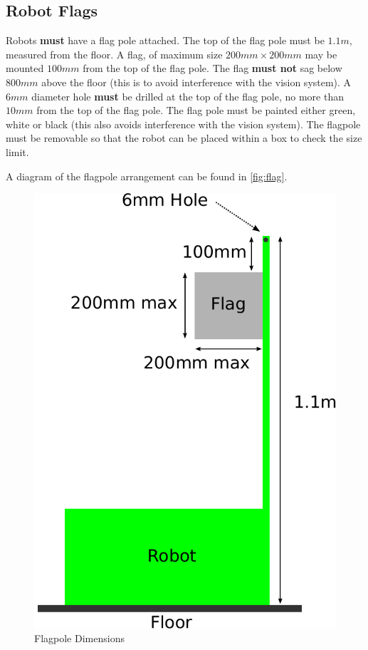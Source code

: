 \subsection{Robot Flags}
\label{sub:Flags}

Robots \textbf{must} have a flag pole attached.
The top of the flag pole must be $1.1m$, measured from the floor.
A flag, of maximum size $200mm \times 200mm$ may be mounted $100mm$ from the top of the flag pole.
The flag \textbf{must not} sag below $800mm$ above the floor (this is to avoid interference with the vision system).
A $6mm$ diameter hole \textbf{must} be drilled at the top of the flag pole, no more than $10mm$ from the top of the flag pole.
The flag pole must be painted either green, white or black (this also avoids interference with the vision system).
The flagpole must be removable so that the robot can be placed within a box to check the size limit.

A diagram of the flagpole arrangement can be found in \autoref{fig:flag}.

\begin{figure}
 \begin{center}
  \includegraphics[keepaspectratio, scale =0.7]{./images/flag-2011.pdf}
  \caption{\label{fig:flag}Flagpole Dimensions}
 \end{center}
\end{figure}
\clearpage
